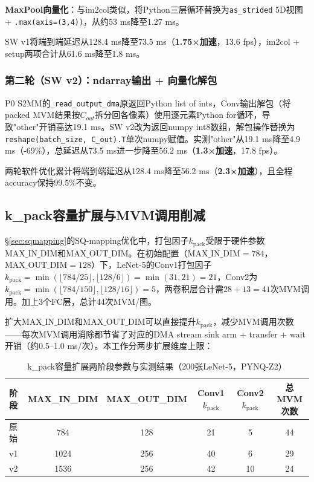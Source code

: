 \documentclass[12pt, a4paper]{article}
\begin{document}
\textbf{MaxPool向量化}：与im2col类似，将Python三层循环替换为\texttt{as\_strided} 5D视图 + \texttt{.max(axis=(3,4))}，从约53 ms降至1.27 ms。

SW v1将端到端延迟从128.4 ms降至73.5 ms（\textbf{1.75×加速}，13.6 fps），im2col + setup两项合计从61.6 ms降至1.8 ms。

\subsubsection{第二轮（SW v2）：ndarray输出 + 向量化解包}

P0 S2MM的\texttt{\_read\_output\_dma}原返回Python list of ints，Conv输出解包（将packed MVM结果按$C_{out}$拆分回各像素）使用逐元素Python for循环，导致"other"开销高达19.1 ms。SW v2改为返回numpy int8数组，解包操作替换为\texttt{reshape(batch\_size, C\_out).T}单次numpy赋值。实测"other"从19.1 ms降至4.9 ms（-69\%），总延迟从73.5 ms进一步降至56.2 ms（\textbf{1.3×加速}，17.8 fps）。

两轮软件优化累计将端到端延迟从128.4 ms降至56.2 ms（\textbf{2.3×加速}），且全程accuracy保持99.5\%不变。

\subsection{k\_pack容量扩展与MVM调用削减}
\label{sec:kpack_expansion}

§\ref{sec:sqmapping}的SQ-mapping优化中，打包因子$k_{\text{pack}}$受限于硬件参数$\text{MAX\_IN\_DIM}$和$\text{MAX\_OUT\_DIM}$。在初始配置（$\text{MAX\_IN\_DIM}=784$，$\text{MAX\_OUT\_DIM}=128$）下，LeNet-5的Conv1打包因子$k_{\text{pack}} = \min(\lfloor784/25\rfloor, \lfloor128/6\rfloor) = \min(31, 21) = 21$，Conv2为$k_{\text{pack}} = \min(\lfloor784/150\rfloor, \lfloor128/16\rfloor) = 5$，两卷积层合计需$28+13=41$次MVM调用。加上3个FC层，总计44次MVM/图。

扩大$\text{MAX\_IN\_DIM}$和$\text{MAX\_OUT\_DIM}$可以直接提升$k_{\text{pack}}$，减少MVM调用次数——每次MVM调用消除都节省了对应的DMA stream sink arm + transfer + wait开销（约0.5--1.0 ms/次）。本工作分两步扩展维度上限：

\begin{table}[H]
    \centering
    \caption{k\_pack容量扩展两阶段参数与实测结果（200张LeNet-5，PYNQ-Z2）}
    \label{tab:kpack_expansion}
    \small
    \begin{tabular}{lccccc}
        \toprule
        阶段 & MAX\_IN\_DIM & MAX\_OUT\_DIM & Conv1 $k_{\text{pack}}$ & Conv2 $k_{\text{pack}}$ & 总MVM次数 \\
        \midrule
        原始 & 784 & 128 & 21 & 5 & 44 \\
        v1 & 1024 & 256 & 40 & 6 & 29 \\
        v2 & 1536 & 256 & 42 & 10 & 24 \\
        \bottomrule
    \end{tabular}
\end{table}
\end{document}
